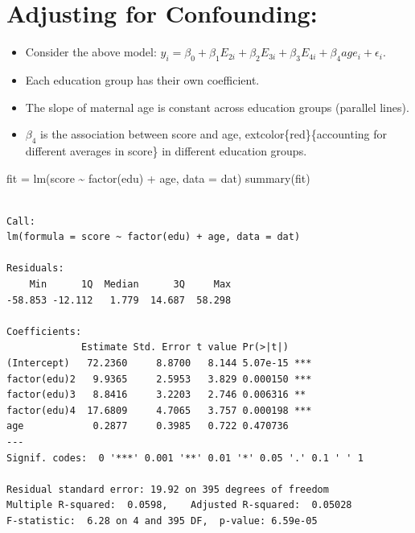 \documentclass[
  letterpaper,
  DIV=11,
  numbers=noendperiod]{scrreprt}
\newenvironment{Shaded}{\begin{snugshade}}{\end{snugshade}}
\newcommand{\AttributeTok}[1]{\textcolor[rgb]{0.40,0.45,0.13}{#1}}
\newcommand{\FunctionTok}[1]{\textcolor[rgb]{0.28,0.35,0.67}{#1}}
\newcommand{\NormalTok}[1]{\textcolor[rgb]{0.00,0.23,0.31}{#1}}
\newcommand{\OtherTok}[1]{\textcolor[rgb]{0.00,0.23,0.31}{#1}}
\newcommand{\SpecialCharTok}[1]{\textcolor[rgb]{0.37,0.37,0.37}{#1}}
\begin{document}
\hypertarget{adjusting-for-confounding}{%
\section*{Adjusting for Confounding:}\label{adjusting-for-confounding}}


\begin{itemize}
\item
  Consider the above model:
  \(y_i = \beta_0 + \beta_1 E_{2i} + \beta_2 E_{3i} + \beta_3 E_{4i} + \beta_4 age_i + \epsilon_i\).
\item
  Each education group has their own coefficient.
\item
  The slope of maternal age is constant across education groups
  (parallel lines).
\item
  \(\beta_4\) is the association between score and age,
  extcolor\{red\}\{accounting for different averages in score\} in
  different education groups.
\end{itemize}

\begin{Shaded}
\begin{Highlighting}[]
\NormalTok{fit }\OtherTok{=} \FunctionTok{lm}\NormalTok{(score }\SpecialCharTok{\textasciitilde{}} \FunctionTok{factor}\NormalTok{(edu)  }\SpecialCharTok{+}\NormalTok{ age, }\AttributeTok{data =}\NormalTok{ dat)}
\FunctionTok{summary}\NormalTok{(fit)}
\end{Highlighting}
\end{Shaded}

\begin{verbatim}

Call:
lm(formula = score ~ factor(edu) + age, data = dat)

Residuals:
    Min      1Q  Median      3Q     Max 
-58.853 -12.112   1.779  14.687  58.298 

Coefficients:
             Estimate Std. Error t value Pr(>|t|)    
(Intercept)   72.2360     8.8700   8.144 5.07e-15 ***
factor(edu)2   9.9365     2.5953   3.829 0.000150 ***
factor(edu)3   8.8416     3.2203   2.746 0.006316 ** 
factor(edu)4  17.6809     4.7065   3.757 0.000198 ***
age            0.2877     0.3985   0.722 0.470736    
---
Signif. codes:  0 '***' 0.001 '**' 0.01 '*' 0.05 '.' 0.1 ' ' 1

Residual standard error: 19.92 on 395 degrees of freedom
Multiple R-squared:  0.0598,    Adjusted R-squared:  0.05028 
F-statistic:  6.28 on 4 and 395 DF,  p-value: 6.59e-05
\end{verbatim}
\end{document}
